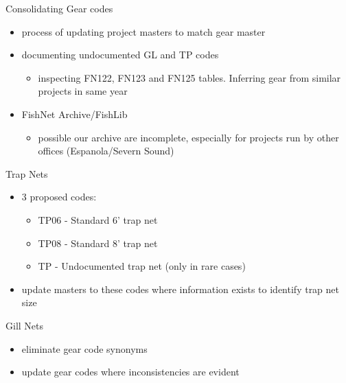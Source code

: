 \documentclass[bigger]{beamer}
\begin{document}
\begin{frame}[label=sec-18]{Consolidating Gear codes}
\begin{itemize}
\item process of updating project masters to match gear master
\item documenting undocumented GL and TP codes
\begin{itemize}
\item inspecting FN122, FN123 and FN125 tables.  Inferring gear from
similar projects in same year
\end{itemize}
\item FishNet Archive/FishLib
\begin{itemize}
\item possible our archive are incomplete,  especially for projects run
by other offices (Espanola/Severn Sound)
\end{itemize}
\end{itemize}
\end{frame}

\begin{frame}[label=sec-19]{Trap Nets}
\begin{itemize}
\item 3 proposed codes:
\begin{itemize}
\item TP06 - Standard 6' trap net
\item TP08 - Standard 8' trap net
\item TP  - Undocumented trap net (only in rare cases)
\end{itemize}
\item update masters to these codes where information exists to identify
trap net size
\end{itemize}
\end{frame}

\begin{frame}[label=sec-20]{Gill Nets}
\begin{itemize}
\item eliminate gear code synonyms
\item update gear codes where inconsistencies are evident
\end{itemize}
\end{frame}
\end{document}
